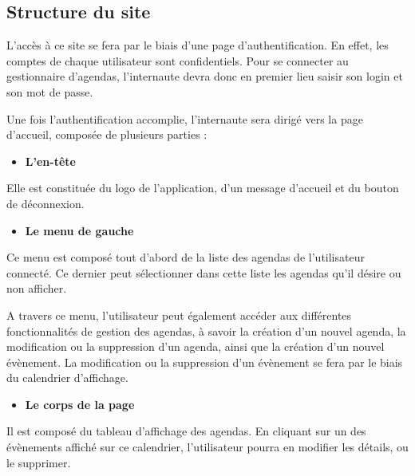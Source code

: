 \documentclass[12pt , a4paper]{article}
\begin{document}
\subsection{Structure du site}


L{\textquoteright}acc\`es \`a ce site se fera par le biais
d{\textquoteright}une page d{\textquoteright}authentification. En
effet, les comptes de chaque utilisateur sont confidentiels. Pour se
connecter au gestionnaire d{\textquoteright}agendas,
l{\textquoteright}internaute devra donc en premier lieu saisir son
login et son mot de passe.

\vspace{0.5cm}

\noindent Une fois l{\textquoteright}authentification accomplie,
l{\textquoteright}internaute sera dirig\'e vers la page
d{\textquoteright}accueil, compos\'ee de plusieurs parties :


\begin{itemize}
\item \textbf{L{\textquoteright}en-t\^ete}
\end{itemize}
Elle est constitu\'ee du logo de l{\textquoteright}application,
d{\textquoteright}un message d{\textquoteright}accueil et du bouton de
d\'econnexion.

\vspace{0.5cm}
\begin{itemize}
\item \textbf{Le menu de gauche~}
\end{itemize}
Ce menu est compos\'e tout d{\textquoteright}abord de la liste des
agendas de l{\textquoteright}utilisateur connect\'e. Ce dernier peut
s\'electionner dans cette liste les agendas qu{\textquoteright}il
d\'esire ou non afficher.

\noindent A travers ce menu, l{\textquoteright}utilisateur peut \'egalement
acc\'eder aux diff\'erentes fonctionnalit\'es de gestion des agendas,
\`a savoir la cr\'eation d{\textquoteright}un nouvel agenda, la
modification ou la suppression d{\textquoteright}un agenda, ainsi que
la cr\'eation d{\textquoteright}un nouvel \'ev\`enement. La
modification ou la suppression d{\textquoteright}un \'ev\`enement se
fera par le biais du calendrier d{\textquoteright}affichage.

\vspace{0.5cm}
\begin{itemize}
\item \textbf{Le corps de la page}
\end{itemize}
Il est compos\'e du tableau d{\textquoteright}affichage des agendas. En
cliquant sur un des \'ev\`enements affich\'e sur ce calendrier,
l{\textquoteright}utilisateur pourra en modifier les d\'etails, ou le
supprimer.
\end{document}
